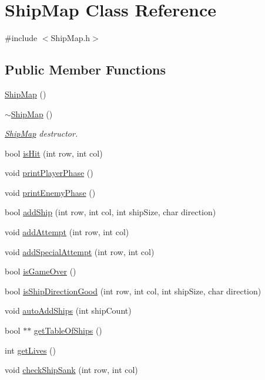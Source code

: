 \hypertarget{classShipMap}{}\section{Ship\+Map Class Reference}
\label{classShipMap}


{\ttfamily \#include $<$Ship\+Map.\+h$>$}

\subsection*{Public Member Functions}
\begin{DoxyCompactItemize}
\item 
\hyperlink{classShipMap_af52a69332839e08c8f4c6e24758f32da}{Ship\+Map} ()
\item 
\mbox{\label{classShipMap_a82afc59f9e7ed5b8d208de36bab9236c}} 
\hyperlink{classShipMap_a82afc59f9e7ed5b8d208de36bab9236c}{$\sim$\+Ship\+Map} ()
\begin{DoxyCompactList}\small\item\em \hyperlink{classShipMap}{Ship\+Map} destructor. \end{DoxyCompactList}\item 
bool \hyperlink{classShipMap_acbcf28e008f8852cba70071dbd01d3d7}{is\+Hit} (int row, int col)
\item 
void \hyperlink{classShipMap_a3406681bb484d65d1ee500e373facd52}{print\+Player\+Phase} ()
\item 
void \hyperlink{classShipMap_ada4c2a63b5cf6f8cac09c5827cb36a7c}{print\+Enemy\+Phase} ()
\item 
bool \hyperlink{classShipMap_a5058e9e8169f0b178ac604e0dbca760e}{add\+Ship} (int row, int col, int ship\+Size, char direction)
\item 
void \hyperlink{classShipMap_a216754cfcb75424c6dfd8fcb3f0976c3}{add\+Attempt} (int row, int col)
\item 
void \hyperlink{classShipMap_a58ca03a712d0a8e4f1376ff7b79f83ae}{add\+Special\+Attempt} (int row, int col)
\item 
bool \hyperlink{classShipMap_a6dbc6a05cdc3ff75bf43f66b9a23fd47}{is\+Game\+Over} ()
\item 
bool \hyperlink{classShipMap_a881a6669552d2fba7d88f53c1ef21985}{is\+Ship\+Direction\+Good} (int row, int col, int ship\+Size, char direction)
\item 
void \hyperlink{classShipMap_ad8b0821085e4fe522658c529f72ce477}{auto\+Add\+Ships} (int ship\+Count)
\item 
bool $\ast$$\ast$ \hyperlink{classShipMap_a3db9ea06b3d046991d891ae537da8cf9}{get\+Table\+Of\+Ships} ()
\item 
int \hyperlink{classShipMap_ac9ff6e1eb462884b8c0b9cd4bafaf471}{get\+Lives} ()
\item 
void \hyperlink{classShipMap_aad5f7baf4e69a8bee04b3d132c52ead1}{check\+Ship\+Sank} (int row, int col)
\end{DoxyCompactItemize}


